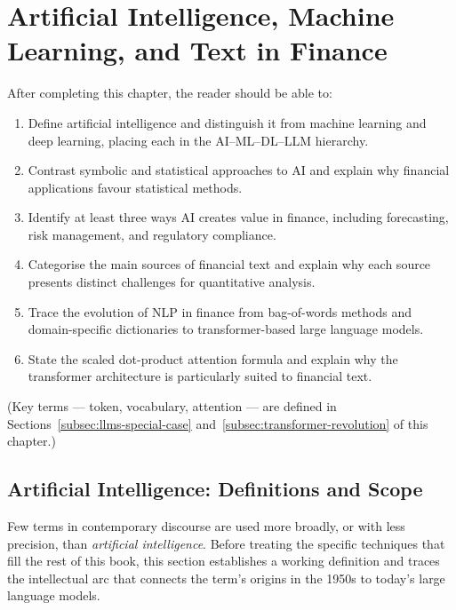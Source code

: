 \chapter{Artificial Intelligence, Machine Learning, and Text in Finance}
\label{ch:ai-ml-finance-text}

\begin{remark}
After completing this chapter, the reader should be able to:
\begin{enumerate}
  \item Define artificial intelligence and distinguish it from machine learning
        and deep learning, placing each in the AI--ML--DL--LLM hierarchy.
  \item Contrast symbolic and statistical approaches to AI and explain why
        financial applications favour statistical methods.
  \item Identify at least three ways AI creates value in finance, including
        forecasting, risk management, and regulatory compliance.
  \item Categorise the main sources of financial text and explain why each
        source presents distinct challenges for quantitative analysis.
  \item Trace the evolution of NLP in finance from bag-of-words methods and
        domain-specific dictionaries to transformer-based large language models.
  \item State the scaled dot-product attention formula and explain why the
        transformer architecture is particularly suited to financial text.
\end{enumerate}
(Key terms --- token, vocabulary, attention --- are defined in Sections~\ref{subsec:llms-special-case} and~\ref{subsec:transformer-revolution} of this chapter.)
\end{remark}

\section{Artificial Intelligence: Definitions and Scope}
\label{sec:ai-definitions}

Few terms in contemporary discourse are used more broadly, or with less
precision, than \emph{artificial intelligence}.  Before treating the
specific techniques that fill the rest of this book, this section
establishes a working definition and traces the intellectual arc that
connects the term's origins in the 1950s to today's large language
models.

